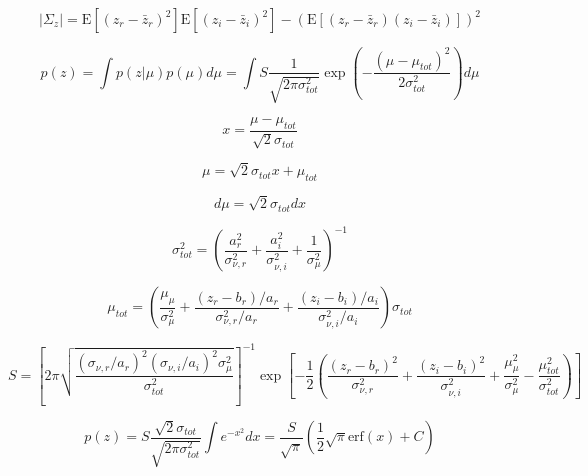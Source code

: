 \documentclass{article}         %
\theoremstyle{definition}
\theoremstyle{remark}
\begin{document}
\begin{equation}
	\lvert\Sigma_z\rvert = \mathrm{E}\left[\left(z_r - \bar{z}_r\right)^2\right]\mathrm{E}\left[\left(z_i - \bar{z}_i\right)^2\right] - \left(\mathrm{E}\left[\left(z_r - \bar{z}_r\right)\left(z_i - \bar{z}_i\right)\right]\right)^2
\end{equation}

\begin{equation}
	p\left(z\right) = \int p\left(z|\mu\right)p\left(\mu\right)d\mu = \int S\frac{1}{\sqrt{2\pi\sigma_{tot}^2}}\exp\left(-\frac{\left(\mu - \mu_{tot}\right)^2}{2\sigma_{tot}^2}\right)d\mu
\end{equation}

\begin{equation}
	x = \frac{\mu - \mu_{tot}}{\sqrt{2}\sigma_{tot}}
\end{equation}

\begin{equation}
	\mu = \sqrt{2}\sigma_{tot}x + \mu_{tot}
\end{equation}

\begin{equation}
	d\mu = \sqrt{2}\sigma_{tot}dx
\end{equation}

\begin{equation}
	\sigma_{tot}^2 = \left(\frac{a_r^2}{\sigma_{\nu,r}^2} + \frac{a_i^2}{\sigma_{\nu,i}^2} + \frac{1}{\sigma_\mu^2}\right)^{-1}
\end{equation}

\begin{equation}
	\mu_{tot} = \left(\frac{\mu_\mu}{\sigma_\mu^2} + \frac{\left(z_r - b_r\right)/a_r}{\sigma_{\nu,r}^2/a_r} + \frac{\left(z_i - b_i\right)/a_i}{\sigma_{\nu,i}^2/a_i}\right)\sigma_{tot}
\end{equation}

\begin{equation}
	S = \left[2\pi\sqrt{\frac{\left(\sigma_{\nu,r}/a_r\right)^2\left(\sigma_{\nu,i}/a_i\right)^2\sigma_\mu^2}{\sigma_{tot}^2}}\right]^{-1}\exp\left[-\frac{1}{2}\left(\frac{\left(z_r - b_r\right)^2}{\sigma_{\nu,r}^2} + \frac{\left(z_i - b_i\right)^2}{\sigma_{\nu,i}^2} + \frac{\mu_\mu^2}{\sigma_\mu^2} - \frac{\mu_{tot}^2}{\sigma_{tot}^2}\right)\right]
\end{equation}

\begin{equation}
	p\left(z\right) = S\frac{\sqrt{2}\sigma_{tot}}{\sqrt{2\pi\sigma_{tot}^2}}\int e^{-x^2}dx = \frac{S}{\sqrt{\pi}}\left(\frac{1}{2}\sqrt{\pi}\mathrm{erf}\left(x\right) + C\right)
\end{equation}
\end{document}

